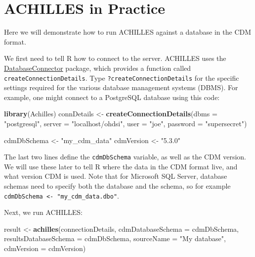 \documentclass[11pt]{book}
\newenvironment{Shaded}{\begin{snugshade}}{\end{snugshade}}
\newcommand{\KeywordTok}[1]{\textcolor[rgb]{0.13,0.29,0.53}{\textbf{#1}}}
\newcommand{\DataTypeTok}[1]{\textcolor[rgb]{0.13,0.29,0.53}{#1}}
\newcommand{\StringTok}[1]{\textcolor[rgb]{0.31,0.60,0.02}{#1}}
\newcommand{\NormalTok}[1]{#1}
\theoremstyle{definition}
\theoremstyle{definition}
\theoremstyle{definition}
\theoremstyle{remark}
\begin{document}
\section{ACHILLES in Practice}\label{achillesInPractice}

Here we will demonstrate how to run ACHILLES against a database in the
CDM format.

We first need to tell R how to connect to the server. ACHILLES uses the
\href{https://ohdsi.github.io/DatabaseConnector/}{DatabaseConnector}
package, which provides a function called
\texttt{createConnectionDetails}. Type \texttt{?createConnectionDetails}
for the specific settings required for the various database management
systems (DBMS). For example, one might connect to a PostgreSQL database
using this code:

\begin{Shaded}
\begin{Highlighting}[]
\KeywordTok{library}\NormalTok{(Achilles)}
\NormalTok{connDetails <-}\StringTok{ }\KeywordTok{createConnectionDetails}\NormalTok{(}\DataTypeTok{dbms =} \StringTok{"postgresql"}\NormalTok{,}
                                       \DataTypeTok{server =} \StringTok{"localhost/ohdsi"}\NormalTok{,}
                                       \DataTypeTok{user =} \StringTok{"joe"}\NormalTok{,}
                                       \DataTypeTok{password =} \StringTok{"supersecret"}\NormalTok{)}

\NormalTok{cdmDbSchema <-}\StringTok{ "my_cdm_data"}
\NormalTok{cdmVersion <-}\StringTok{ "5.3.0"}
\end{Highlighting}
\end{Shaded}

The last two lines define the \texttt{cdmDbSchema} variable, as well as
the CDM version. We will use these later to tell R where the data in the
CDM format live, and what version CDM is used. Note that for Microsoft
SQL Server, database schemas need to specify both the database and the
schema, so for example
\texttt{cdmDbSchema\ \textless{}-\ "my\_cdm\_data.dbo"}.

Next, we run ACHILLES:

\begin{Shaded}
\begin{Highlighting}[]
\NormalTok{result <-}\StringTok{ }\KeywordTok{achilles}\NormalTok{(connectionDetails,}
                   \DataTypeTok{cdmDatabaseSchema =}\NormalTok{ cdmDbSchema,}
                   \DataTypeTok{resultsDatabaseSchema =}\NormalTok{ cdmDbSchema,}
                   \DataTypeTok{sourceName =} \StringTok{"My database"}\NormalTok{,}
                   \DataTypeTok{cdmVersion =}\NormalTok{ cdmVersion)}
\end{Highlighting}
\end{Shaded}
\end{document}

